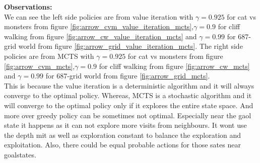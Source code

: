 \documentclass{article}
\begin{document}
\textbf{Observations:}\\
We can see the left side policies are from value iteration with $\gamma=0.925$ for cat vs monsters from figure \ref{fig:arrow_cvm_value_iteration_mcts},$\gamma=0.9$ for cliff walking from figure \ref{fig:arrow_cw_value_iteration_mcts} and $\gamma=0.99$ for 687-grid world from figure \ref{fig:arrow_grid_value_iteration_mcts}.
The right side policies are from MCTS with $\gamma=0.925$ for cat vs monsters from figure \ref{fig:arrow_cvm_mcts},$\gamma=0.9$ for cliff walking from figure \ref{fig:arrow_cw_mcts} and $\gamma=0.99$ for 687-grid world from figure \ref{fig:arrow_grid_mcts}.\\

This is because the value iteration is a deterministic algorithm and it will always converge to the optimal policy. Whereas, MCTS is a stochastic algorithm and it will converge to the optimal policy only if it explores the entire state space. And more over greedy policy can be sometimes not optimal. Especially near the gaol state it happens as it can not explore more visits from neighbours. It wont use the depth mit as well as exploration constant to balance the exploration and exploitation. Also, there could be equal probable actions for those sates near goalstates.
\end{document}
